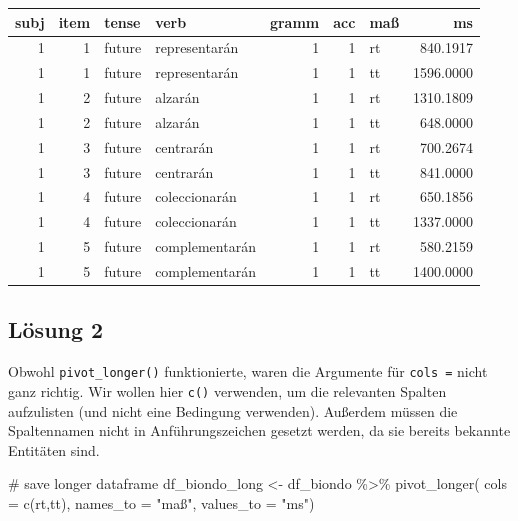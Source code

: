 \documentclass[
  letterpaper,
  DIV=11]{scrartcl}
\newenvironment{Shaded}{\begin{snugshade}}{\end{snugshade}}
\newcommand{\AttributeTok}[1]{\textcolor[rgb]{0.40,0.45,0.13}{#1}}
\newcommand{\CommentTok}[1]{\textcolor[rgb]{0.37,0.37,0.37}{#1}}
\newcommand{\FunctionTok}[1]{\textcolor[rgb]{0.28,0.35,0.67}{#1}}
\newcommand{\NormalTok}[1]{\textcolor[rgb]{0.00,0.23,0.31}{#1}}
\newcommand{\OtherTok}[1]{\textcolor[rgb]{0.00,0.23,0.31}{#1}}
\newcommand{\SpecialCharTok}[1]{\textcolor[rgb]{0.37,0.37,0.37}{#1}}
\newcommand{\StringTok}[1]{\textcolor[rgb]{0.13,0.47,0.30}{#1}}
\begin{document}
\begin{table}
\centering\begingroup\fontsize{20}{22}\selectfont

\begin{tabular}{r|r|l|l|r|r|l|r}
\hline
subj & item & tense & verb & gramm & acc & maß & ms\\
\hline
1 & 1 & future & representarán & 1 & 1 & rt & 840.1917\\
\hline
1 & 1 & future & representarán & 1 & 1 & tt & 1596.0000\\
\hline
1 & 2 & future & alzarán & 1 & 1 & rt & 1310.1809\\
\hline
1 & 2 & future & alzarán & 1 & 1 & tt & 648.0000\\
\hline
1 & 3 & future & centrarán & 1 & 1 & rt & 700.2674\\
\hline
1 & 3 & future & centrarán & 1 & 1 & tt & 841.0000\\
\hline
1 & 4 & future & coleccionarán & 1 & 1 & rt & 650.1856\\
\hline
1 & 4 & future & coleccionarán & 1 & 1 & tt & 1337.0000\\
\hline
1 & 5 & future & complementarán & 1 & 1 & rt & 580.2159\\
\hline
1 & 5 & future & complementarán & 1 & 1 & tt & 1400.0000\\
\hline
\end{tabular}
\endgroup{}
\end{table}

\subsection{Lösung 2}

Obwohl \texttt{pivot\_longer()} funktionierte, waren die Argumente für
\texttt{cols\ =} nicht ganz richtig. Wir wollen hier \texttt{c()}
verwenden, um die relevanten Spalten aufzulisten (und nicht eine
Bedingung verwenden). Außerdem müssen die Spaltennamen nicht in
Anführungszeichen gesetzt werden, da sie bereits bekannte Entitäten
sind.

\begin{Shaded}
\begin{Highlighting}[numbers=left,,]
\CommentTok{\# save longer dataframe}
\NormalTok{df\_biondo\_long }\OtherTok{\textless{}{-}}\NormalTok{ df\_biondo }\SpecialCharTok{\%\textgreater{}\%} 
  \FunctionTok{pivot\_longer}\NormalTok{(}
    \AttributeTok{cols =} \FunctionTok{c}\NormalTok{(rt,tt),}
    \AttributeTok{names\_to =} \StringTok{"maß"}\NormalTok{,}
    \AttributeTok{values\_to =} \StringTok{"ms"}\NormalTok{)}
\end{Highlighting}
\end{Shaded}
\end{document}
